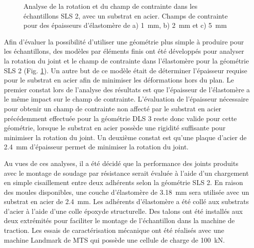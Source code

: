 \begin{figure}[h]
	\centering
	\qquad
	\caption{Analyse de la rotation et du champ de contrainte dans les échantillons SLS 2, avec un substrat en acier. Champs de contrainte pour des épaisseurs d'élastomère de a) \SI{1}{\milli\metre}, b) \SI{2}{\milli\metre} et c) \SI{5}{\milli\metre}}
	\label{fig:SLS_metal}
\end{figure}

Afin d'évaluer la possibilité d'utiliser une géométrie plus simple à produire pour les échantillons, des modèles par éléments finis ont été développés pour analyser la rotation du joint et le champ de contrainte dans l'élastomère pour la géométrie SLS 2 (Fig. \ref{fig:SLS_metal}). 
Un autre but de ce modèle était de déterminer l'épaisseur requise pour le substrat en acier afin de minimiser les déformations hors du plan.  
Le premier constat lors de l'analyse des résultats est que l'épaisseur de l'élastomère a le même impact sur le champ de contrainte. 
L'évaluation de l'épaisseur nécessaire pour obtenir un champ de contrainte non affecté par le substrat en acier précédemment effectuée pour la géométrie DLS 3 reste donc valide pour cette géométrie, lorsque le substrat en acier possède une rigidité suffisante pour minimiser la rotation du joint. 
Un deuxième constat est qu'une plaque d'acier de \SI[locale=FR]{2.4}{\milli\metre} d'épaisseur permet de minimiser la rotation du joint. 

Au vues de ces analyses, il a été décidé que la performance des joints produits avec le montage de soudage par résistance serait évaluée à l'aide d'un chargement en simple cisaillement entre deux adhérents selon la géométrie SLS 2. 
En raison des moules disponibles, une couche d'élastomère de \SI[locale=FR]{3.18}{\milli\metre} sera utilisée avec un substrat en acier de \SI[locale=FR]{2.4}{\milli\metre}. 
Les adhérents d'élastomère a été collé aux substrats d'acier à l'aide d'une colle époxyde structurelle. 
Des talons ont été installés aux deux extrémités pour faciliter le montage de l'échantillon dans la machine de traction. 
Les essais de caractérisation mécanique ont été réalisés avec une machine Landmark de MTS qui possède une cellule de charge de \SI[locale=FR]{100}{\kilo\newton}. 

